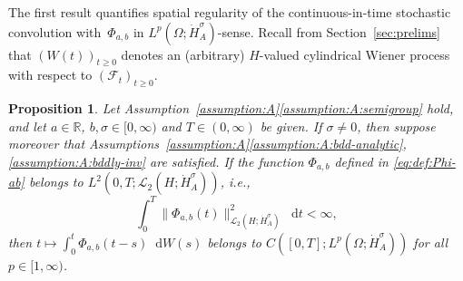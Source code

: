 \documentclass[reqno]{amsart}
\numberwithin{equation}{section}
\newcommand{\R}{\mathbb{R}}
\newcommand{\cF}{\mathcal{F}}
\newcommand{\norm}[2]{     \| #1       \|_{ #2 }}
\newcommand{\rd}{\mathop{}\!\mathrm{d}}
\newcommand{\Hdot}[1]{\dot{H}^{#1}_A}
\newtheorem{proposition}[lemma]{Proposition}
\theoremstyle{remark}
\theoremstyle{definition}
\begin{document}
The first result quantifies  
spatial regularity of the  
continuous-in-time stochastic 
convolution with~$\Phi_{a,b}$ 
in $L^p(\Omega; \Hdot{\sigma})$-sense. 
Recall from Section~\ref{sec:prelims} that 
$(W(t))_{t\geq 0}$ 
denotes an (arbitrary) $H$-valued cylindrical Wiener process
with respect to
$(\cF_t)_{t\geq 0}$. 

\begin{proposition}\label{prop:continuity-in-time}
	Let 
	Assumption~\textup{\ref{assumption:A}\ref{assumption:A:semigroup}} 
	hold, and 
	let $a \in \R$, $b,\sigma \in [0,\infty)$  
	and $T \in (0,\infty)$ be given.
	If $\sigma\neq0$, then suppose moreover that 
	Assumptions~\textup{\ref{assumption:A}\ref{assumption:A:bdd-analytic},\ref{assumption:A:bddly-inv}}  
	are satisfied. 
	If the function $\Phi_{a,b}$
	defined in \eqref{eq:def:Phi-ab} 
	belongs to $L^2(0,T; \mathscr L_2(H;\dot{H}^\sigma_A))$, 
	i.e., 
	\[
	\int_0^T
	\norm{\Phi_{a,b}(t)}{\mathscr L_2(H;\dot H_A^\sigma)}^2 \rd t 
	< \infty, 
	\] 
	then $t\mapsto \int_0^t \Phi_{a,b}(t-s)\rd W(s)$ 
	belongs to $C([0,T]; L^p(\Omega;\dot H_A^\sigma))$ 
	for all $p \in [1,\infty)$. 
\end{proposition}
\end{document}
